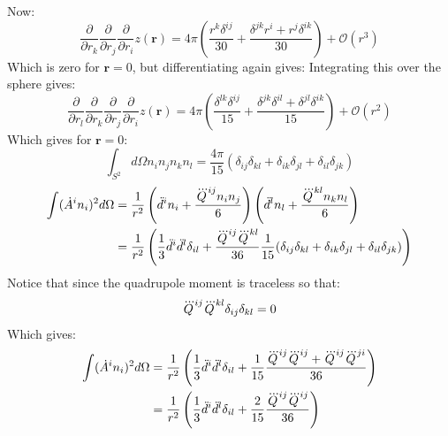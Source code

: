 \documentclass[12pt,a4]{article}
\begin{document}
\begin{enumerate}
\begin{enumerate}
\begin{equation*}
        \end{equation*}
        Now:
        \begin{equation*}
          \frac{\partial}{\partial r_k}\frac{\partial}{\partial r_j}\frac{\partial}{\partial r_i}z(\mathbf{r}) = 4 \pi\left(\frac{r^k\delta^{ij}}{30}+\frac{\delta^{jk}r^i + r^j\delta^{ik}}{30}\right) + \mathcal{O}(r^3)
        \end{equation*}
        Which is zero for $\mathbf{r} = 0$, but differentiating again gives:
        Integrating this over the sphere gives:
        \begin{equation*}
          \frac{\partial}{\partial r_l}\frac{\partial}{\partial r_k}\frac{\partial}{\partial r_j}\frac{\partial}{\partial r_i}z(\mathbf{r}) = 4 \pi\left(\frac{\delta^{lk}\delta^{ij}}{15}+\frac{\delta^{jk}\delta^{il} + \delta^{jl}\delta^{ik}}{15}\right) + \mathcal{O}(r^2)
        \end{equation*}
        Which gives for $\mathbf{r} = 0$:
        \begin{equation*}
          \int_{S^2} d\Omega n_i n_jn_kn_l = \frac{4\pi}{15}(\delta_{ij}\delta_{kl} + \delta_{ik}\delta_{jl} + \delta_{il}\delta_{jk})
        \end{equation*}
        \begin{align*}
          \int(\dot{A}^in_i)^2 d\Omega &= \frac{1}{r^2}\left(\ddot{d}^in_i + \frac{\tensor{\dddot{Q}}{^i^j}n_in_j}{6}\right)\left(\ddot{d}^ln_l + \frac{\tensor{\dddot{Q}}{^k^l}n_kn_l}{6}\right)\\
                                       &= \frac{1}{r^2}\left(\frac{1}{3}\ddot{d}^i \ddot{d}^l\delta_{il} + \frac{\tensor{\dddot{Q}}{^i^j}\tensor{\dddot{Q}}{^k^l}}{36}\frac{1}{15}(\delta_{ij}\delta_{kl} + \delta_{ik}\delta_{jl} + \delta_{il}\delta_{jk})\right)
        \end{align*}
        Notice that since the quadrupole moment is traceless so that:
        \begin{align*}
          \tensor{\dddot{Q}}{^i^j}\tensor{\dddot{Q}}{^k^l} \delta_{ij} \delta_{kl} = 0
        \end{align*}
        Which gives:
        \begin{align*}
          \int(\dot{A}^in_i)^2 d\Omega &= \frac{1}{r^2}\left(\frac{1}{3}\ddot{d}^i \ddot{d}^l\delta_{il} + \frac{1}{15}\frac{\tensor{\dddot{Q}}{^i^j}\tensor{\dddot{Q}}{^i^j} + \tensor{\dddot{Q}}{^i^j}\tensor{\dddot{Q}}{^j^i}}{36}\right)\\
                                       &= \frac{1}{r^2}\left(\frac{1}{3}\ddot{d}^i \ddot{d}^l\delta_{il} + \frac{2}{15}\frac{\tensor{\dddot{Q}}{^i^j}\tensor{\dddot{Q}}{^i^j}}{36}\right)\\

\end{align*}
\end{enumerate}
\end{enumerate}
\end{document}
